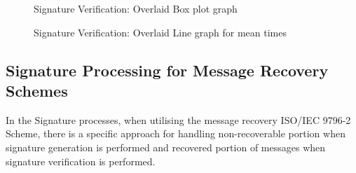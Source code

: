 \documentclass[]{final_report}
\theoremstyle{definition}
\begin{document}
\begin{figure}[H]
\begin{minipage}{0.7\textwidth}
        \caption{Signature Verification: Overlaid Box plot graph}
        \label{fig:image2} 
    \end{minipage}
     \begin{minipage}{0.7\textwidth}
        \centering
        \caption{Signature Verification: Overlaid Line graph for mean times}
        \label{fig:image2}
    \end{minipage}
\end{figure}

\subsection{Signature Processing for Message Recovery Schemes}

In the Signature processes, when utilising the message recovery ISO/IEC 9796-2 Scheme, there is a specific approach for handling non-recoverable portion when signature generation is performed and recovered portion of messages when signature verification is performed.
\end{document}
